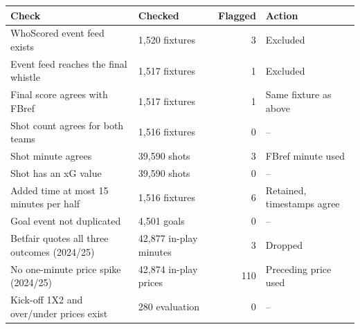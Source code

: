 \begin{tabular}{llrl}
\toprule
Check & Checked & Flagged & Action \\
\midrule
WhoScored event feed exists & 1{,}520 fixtures & 3 & Excluded \\
Event feed reaches the final whistle & 1{,}517 fixtures & 1 & Excluded \\
Final score agrees with FBref & 1{,}517 fixtures & 1 & Same fixture as above \\
Shot count agrees for both teams & 1{,}516 fixtures & 0 & -- \\
Shot minute agrees & 39{,}590 shots & 3 & FBref minute used \\
Shot has an xG value & 39{,}590 shots & 0 & -- \\
Added time at most 15 minutes per half & 1{,}516 fixtures & 6 & Retained, timestamps agree \\
Goal event not duplicated & 4{,}501 goals & 0 & -- \\
Betfair quotes all three outcomes (2024/25) & 42{,}877 in-play minutes & 3 & Dropped \\
No one-minute price spike (2024/25) & 42{,}874 in-play prices & 110 & Preceding price used \\
Kick-off 1X2 and over/under prices exist & 280 evaluation & 0 & -- \\
\bottomrule
\end{tabular}
